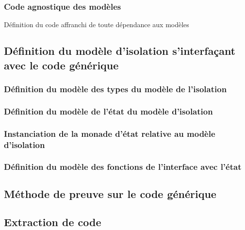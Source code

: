 			\subsubsection{Code agnostique des modèles}

			\begin{listing}[!ht]
				\caption{Définition du code affranchi de toute dépendance aux modèles}
				\label{code:ModelAgnosticCode}
			\end{listing}

		\subsection{Définition du modèle d'isolation s'interfaçant avec le code générique}
			\subsubsection{Définition du modèle des types du modèle de l'isolation}

			\subsubsection{Définition du modèle de l'état du modèle d'isolation}

			\subsubsection{Instanciation de la monade d'état relative au modèle d'isolation}

			\subsubsection{Définition du modèle des fonctions de l'interface avec l'état}

		\subsection{Méthode de preuve sur le code générique}

		\subsection{Extraction de code}

